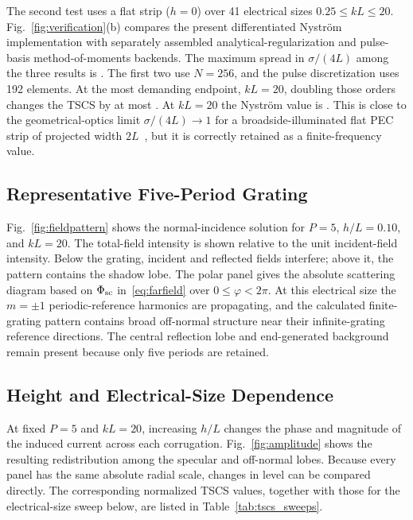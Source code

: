 \documentclass[conference]{IEEEtran}
\begin{document}
The second test uses a flat strip ($h=0$) over 41 electrical sizes
$0.25\leq kL\leq20$.  Fig.~\ref{fig:verification}(b) compares the present
differentiated Nystr\"om implementation with separately assembled
analytical-regularization and pulse-basis method-of-moments backends.  The
maximum spread in $\sigma/(4L)$ among the three results is \BackendMaxDiff.
The first two use $N=256$, and the pulse discretization uses 192 elements.
At the most demanding endpoint, $kL=20$, doubling those orders changes the
TSCS by at most \FlatOrderDoublingMaxChange.
At $kL=20$ the Nystr\"om value is
\FlatTSCSRatioTwenty.  This is close to the geometrical-optics limit
$\sigma/(4L)\to1$ for a broadside-illuminated flat PEC strip of projected
width $2L$~\cite{shapoval2011}, but it is correctly retained as a
finite-frequency value.

\subsection{Representative Five-Period Grating}

Fig.~\ref{fig:fieldpattern} shows the normal-incidence solution for
$P=5$, $h/L=0.10$, and $kL=20$.  The total-field intensity is shown relative
to the unit incident-field intensity.  Below the grating, incident and reflected fields
interfere; above it, the pattern contains the shadow lobe.  The
polar panel gives the absolute scattering diagram based on
$\Phi_{\rm sc}$ in~\eqref{eq:farfield} over $0\leq\varphi<2\pi$.  At this
electrical size the $m=\pm1$ periodic-reference
harmonics are propagating, and the calculated finite-grating pattern contains
broad off-normal structure near their infinite-grating reference directions.
The central
reflection lobe and end-generated background remain present because only five
periods are retained.

\enlargethispage{-1.25in}
\subsection{Height and Electrical-Size Dependence}

At fixed $P=5$ and $kL=20$, increasing $h/L$ changes the phase and magnitude
of the induced current across each corrugation.  Fig.~\ref{fig:amplitude}
shows the resulting redistribution among the specular and off-normal lobes.
Because every panel has the same absolute radial scale, changes in level can be
compared directly.  The corresponding normalized TSCS values, together with
those for the electrical-size sweep below, are listed in
Table~\ref{tab:tscs_sweeps}.
\end{document}

